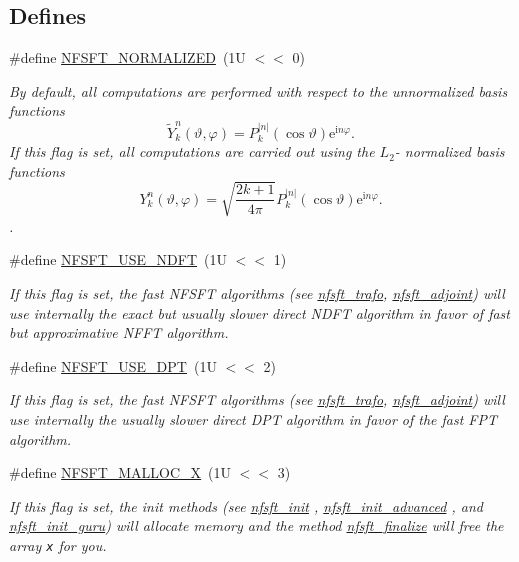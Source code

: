 \subsection*{Defines}
\begin{CompactItemize}
\item 
\#define \hyperlink{group__nfsft_ga25}{NFSFT\_\-NORMALIZED}~(1U $<$$<$ 0)
\begin{CompactList}\small\item\em By default, all computations are performed with respect to the unnormalized basis functions \[ \tilde{Y}_k^n(\vartheta,\varphi) = P_k^{|n|}(\cos\vartheta) \mathrm{e}^{\mathrm{i} n \varphi}. \] If this flag is set, all computations are carried out using the $L_2$- normalized basis functions \[ Y_k^n(\vartheta,\varphi) = \sqrt{\frac{2k+1}{4\pi}} P_k^{|n|}(\cos\vartheta) \mathrm{e}^{\mathrm{i} n \varphi}. \]. \item\end{CompactList}\item 
\#define \hyperlink{group__nfsft_ga26}{NFSFT\_\-USE\_\-NDFT}~(1U $<$$<$ 1)
\begin{CompactList}\small\item\em If this flag is set, the fast NFSFT algorithms (see \hyperlink{group__nfsft_ga8}{nfsft\_\-trafo}, \hyperlink{group__nfsft_ga9}{nfsft\_\-adjoint}) will use internally the exact but usually slower direct NDFT algorithm in favor of fast but approximative NFFT algorithm. \item\end{CompactList}\item 
\#define \hyperlink{group__nfsft_ga27}{NFSFT\_\-USE\_\-DPT}~(1U $<$$<$ 2)
\begin{CompactList}\small\item\em If this flag is set, the fast NFSFT algorithms (see \hyperlink{group__nfsft_ga8}{nfsft\_\-trafo}, \hyperlink{group__nfsft_ga9}{nfsft\_\-adjoint}) will use internally the usually slower direct DPT algorithm in favor of the fast FPT algorithm. \item\end{CompactList}\item 
\#define \hyperlink{group__nfsft_ga28}{NFSFT\_\-MALLOC\_\-X}~(1U $<$$<$ 3)
\begin{CompactList}\small\item\em If this flag is set, the init methods (see \hyperlink{group__nfsft_ga1}{nfsft\_\-init} , \hyperlink{group__nfsft_ga2}{nfsft\_\-init\_\-advanced} , and \hyperlink{group__nfsft_ga3}{nfsft\_\-init\_\-guru}) will allocate memory and the method \hyperlink{group__nfsft_ga10}{nfsft\_\-finalize} will free the array {\tt x} for you. \item\end{CompactList}\item 

\end{CompactItemize}
